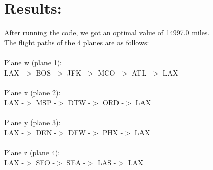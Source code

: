 \documentclass[12pt]{extarticle}
\begin{document}
\section*{\small Results:}
After running the code, we got an optimal value of 14997.0 miles. \\
The flight paths of the 4 planes are as follows: \\ \\
Plane w (plane 1): \\
LAX -$>$ BOS -$>$ JFK -$>$ MCO -$>$ ATL -$>$ LAX \\ \\
Plane x (plane 2): \\
LAX -$>$ MSP -$>$ DTW -$>$ ORD -$>$ LAX \\ \\
Plane y (plane 3): \\
LAX -$>$ DEN -$>$ DFW -$>$ PHX -$>$ LAX \\ \\
Plane z (plane 4): \\
LAX -$>$ SFO -$>$ SEA -$>$ LAS -$>$ LAX \\ \\
\end{document}
